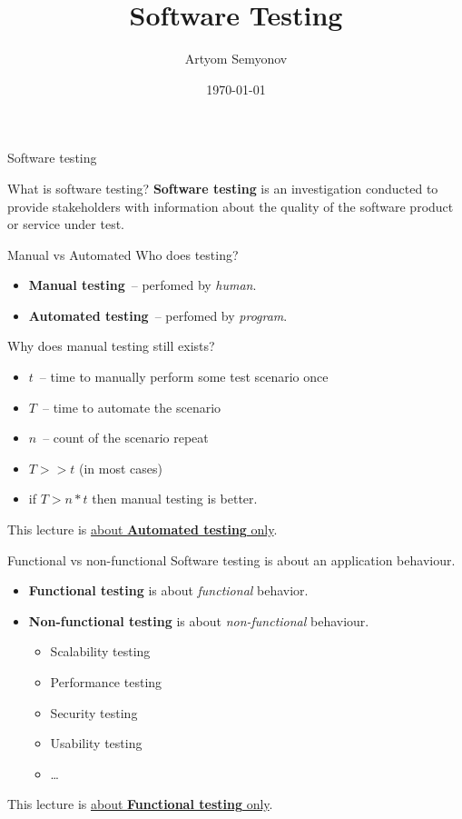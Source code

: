 \documentclass[aspectratio=169]{beamer}
\title{Software Testing}
\author{Artyom Semyonov}
\institute{СПБгУ, СП}
\date{\today}
\begin{document}
\frame{\titlepage}

\begin{frame}{Software testing}
  \begin{block}{What is software testing?}
    \textbf{Software testing} is an investigation conducted to provide stakeholders
    with information about the quality of the software product or service under test.
  \end{block}
\end{frame}

\begin{frame}{Manual vs Automated}
  Who does testing?
  \begin{itemize}
    \item \textbf{Manual testing}~-- perfomed by \textit{human}.
    \item \textbf{Automated testing}~-- perfomed by \textit{program}.
  \end{itemize}
  \pause
  Why does manual testing still exists?
  \pause
  \begin{itemize}
    \item $t$~-- time to manually perform some test scenario once
    \item $T$~-- time to automate the scenario
    \item $n$~-- count of the scenario repeat
    \item $T >> t$ (in most cases)
    \item if $T > n * t$ then manual testing is better.
  \end{itemize}
  \bigskip
  \pause
  This lecture is \underline{about \textbf{Automated testing} only}.
\end{frame}

\begin{frame}{Functional vs non-functional}
  Software testing is about an application behaviour.
  \begin{itemize}
    \item \textbf{Functional testing} is about \textit{functional} behavior.
    \item \textbf{Non-functional testing} is about \textit{non-functional} behaviour.
      \begin{itemize}
        \item Scalability testing
        \item Performance testing
        \item Security testing
        \item Usability testing
        \item \ldots
      \end{itemize}
  \end{itemize}
  \bigskip
  \pause
  This lecture is \underline{about \textbf{Functional testing} only}.
\end{frame}
\end{document}
